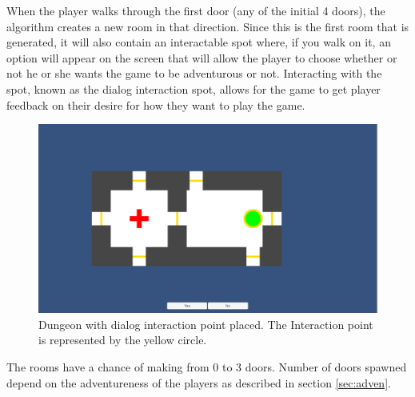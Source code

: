 \documentclass[conference,compsoc]{IEEEtran}
\begin{document}
When the player walks through the first door (any of the initial 4 doors), the algorithm creates a new room in that direction. 
Since this is the first room that is generated, it will also contain an interactable spot where, if you walk on it, an option will appear on the screen that will allow the player to choose whether or not he or she wants the game to be adventurous or not. Interacting with the spot, known as the dialog interaction spot, allows for the game to get player feedback on their desire for how they want to play the game.

\begin{figure}[h]
	\graphicspath{{figures/}}
	\includegraphics[width = \columnwidth ]{DialogSet.png}
	\caption{Dungeon with dialog interaction point placed. The Interaction point is represented by the yellow circle.}
	\label{fig:dialogset}
\end{figure}

The rooms have a chance of making from 0 to 3 doors. Number of doors spawned depend on the adventureness of the players as described in section \ref{sec:adven}.
\end{document}
